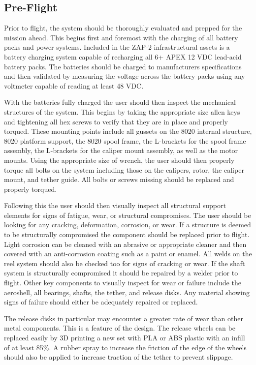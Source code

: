 \subsection*{Pre-Flight}

\indent\indent Prior to flight, the system should be thoroughly evaluated and prepped for the mission ahead. This begins first and foremost with the charging of all battery packs and power systems. Included in the ZAP-2 infrastructural assets is a battery charging system capable of recharging all 6+ APEX 12 VDC lead-acid battery packs. The batteries should be charged to manufacturers specifications and then validated by measuring the voltage across the battery packs using any voltmeter capable of reading at least 48 VDC. 

With the batteries fully charged the user should then inspect the mechanical structures of the system. This begins by taking the appropriate size allen keys and tightening all hex screws to verify that they are in place and properly torqued. These mounting points include all gussets on the 8020 internal structure, 8020 platform support, the 8020 spool frame, the L-brackets for the spool frame assembly, the L-brackets for the caliper mount assembly, as well as the motor mounts. Using the appropriate size of wrench, the user should then properly torque all bolts on the system including those on the calipers, rotor, the caliper mount, and tether guide. All bolts or screws missing should be replaced and properly torqued. 

Following this the user should then visually inspect all structural support elements for signs of fatigue, wear, or structural compromises. The user should be looking for any cracking, deformation, corrosion, or wear. If a structure is deemed to be structurally compromised the component should be replaced prior to flight. Light corrosion can be cleaned with an abrasive or appropriate cleaner and then covered with an anti-corrosion coating such as a paint or enamel. All welds on the reel system should also be checked too for signs of cracking or wear. If the shaft system is structurally compromised it should be repaired by a welder prior to flight. Other key components to visually inspect for wear or failure include the aeroshell, all bearings, shafts, the tether, and release disks. Any material showing signs of failure should either be adequately repaired or replaced.

The release disks in particular may encounter a greater rate of wear than other metal components. This is a feature of the design. The release wheels can be replaced easily by 3D printing a new set with PLA or ABS plastic with an infill of at least 85\%. A rubber spray to increase the friction of the edge of the wheels should also be applied to increase traction of the tether to prevent slippage. 

